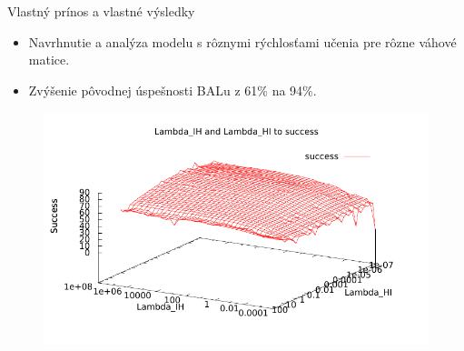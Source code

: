 \documentclass[xcolor=dvipsnames]{beamer}
\begin{document}
\begin{frame}{Vlastný prínos a vlastné výsledky}
  \begin{itemize}
    \item Navrhnutie a analýza modelu s rôznymi rýchlosťami učenia pre rôzne váhové matice.
    \item Zvýšenie pôvodnej úspešnosti BALu z 61\% na 94\%. 
  \end{itemize} 
  
  \begin{figure}[h!]  
    \centering
    \vspace{-8pt} 
    \includegraphics[scale=0.8]{img/success_to_lambdas.pdf}
  \end{figure} 
\end{frame}
\end{document}
